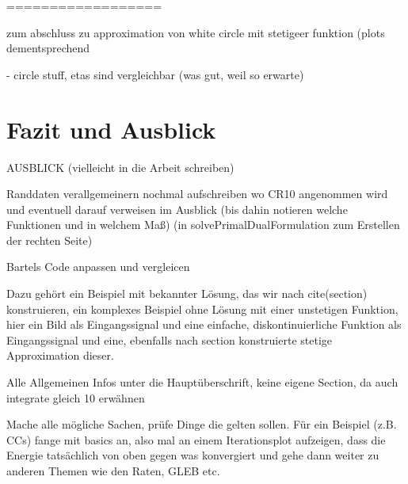 ==================

zum abschluss zu approximation von white circle mit stetigeer funktion (plots
dementsprechend

  - circle stuff, etas sind vergleichbar (was gut, weil so erwarte)


\section{Fazit und Ausblick}

AUSBLICK (vielleicht in die Arbeit schreiben)
  
  Randdaten verallgemeinern
    nochmal aufschreiben wo CR10 angenommen wird und eventuell darauf verweisen 
    im Ausblick (bis dahin notieren welche Funktionen und in welchem Maß)
    (in solvePrimalDualFormulation zum Erstellen der rechten Seite)
    
  Bartels Code anpassen und vergleicen


Dazu gehört ein Beispiel mit bekannter Lösung, das wir nach cite(section)
konstruieren, ein komplexes Beispiel ohne Lösung mit einer unstetigen Funktion,
hier ein Bild als Eingangssignal und eine einfache, diskontinuierliche Funktion
als Eingangssignal und eine, ebenfalls nach section konstruierte stetige 
Approximation dieser.



Alle Allgemeinen Infos unter die Hauptüberschrift, keine eigene Section,
da auch integrate gleich 10 erwähnen



Mache alle mögliche Sachen, prüfe Dinge die gelten sollen. Für ein
Beispiel (z.B. CCs) fange mit basics an, also mal an einem Iterationsplot
aufzeigen, dass die Energie tatsächlich von oben gegen was konvergiert und 
gehe dann weiter zu anderen Themen wie den Raten, GLEB etc.



